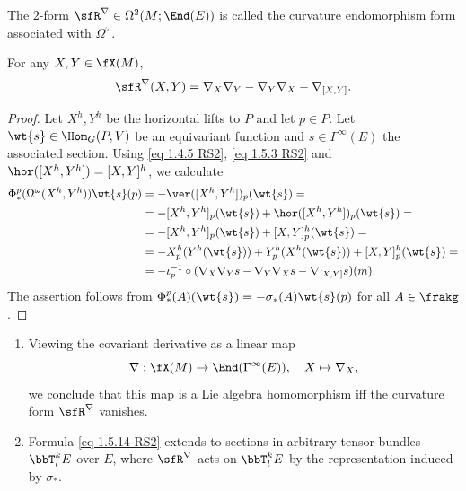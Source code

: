 \begin{defn}\label{def curvature endomorphism}
    The $2$-form $\sfR^\nabla\in\Omega^2(M;\End(E))$ is called the curvature endomorphism form associated with $\Omega^\omega$.
\end{defn}

\begin{prop}[{{\cite[Prop.~1.5.11]{RS2}}}]\label{prop 1.5.11 RS2}
    For any $X,Y\in\fX(M)$,
    \[\sfR^\nabla(X,Y)=\nabla_X\nabla_Y-\nabla_Y\nabla_X-\nabla_{[X,Y]}.\label{eq 1.5.14 RS2}\]
\end{prop}
\begin{proof}
    Let $X^h,Y^h$ be the horizontal lifts to $P$ and let $p\in P$. Let $\wt{s}\in \Hom_G(P,V)$ be an equivariant function and $s\in\Gamma^\infty(E)$ the associated section. Using \eqref{eq 1.4.5 RS2}, \eqref{eq 1.5.3 RS2} and $\hor([X^h,Y^h])=[X,Y]^h$, we calculate
    \begin{align}
        \Phi^p_\ast(\Omega^\omega(X^h,Y^h))\wt{s}(p)&=-\ver([X^h,Y^h])_p(\wt{s})=\notag\\
        &=-[X^h,Y^h]_p(\wt{s})+\hor([X^h,Y^h])_p(\wt{s})=\notag\\
        &=-[X^h,Y^h]_p(\wt{s})+[X,Y]^h_p(\wt{s})=\notag\\
        &=-X^h_p(Y^h(\wt{s}))+Y^h_p(X^h(\wt{s}))+[X,Y]_p^h(\wt{s})=\notag\\
        &=-\iota_p^{-1}\circ (\nabla_X\nabla_Y s-\nabla_Y \nabla_X s-\nabla_{[X,Y]}s)(m).
    \end{align}
    The assertion follows from $\Phi^p_\ast(A)(\wt{s})=-\sigma_\ast(A)\wt{s}(p)$ for all $A\in\frakg$.
\end{proof}


\begin{rem}\label{rem 1.5.12 RS2}
    \begin{enumerate}
        \item Viewing the covariant derivative as a linear map
        \[\nabla:\fX(M)\to \End(\Gamma^\infty(E)),\quad X\mapsto \nabla_X,\]
        we conclude that this map is a Lie algebra homomorphism iff the curvature form $\sfR^\nabla$ vanishes.
        \item Formula \eqref{eq 1.5.14 RS2} extends to sections in arbitrary tensor bundles $\bbT^k_l E$ over $E$, where $\sfR^\nabla$ acts on $\bbT^k_l E$ by the representation induced by $\sigma_\ast$.
    \end{enumerate}
\end{rem}

